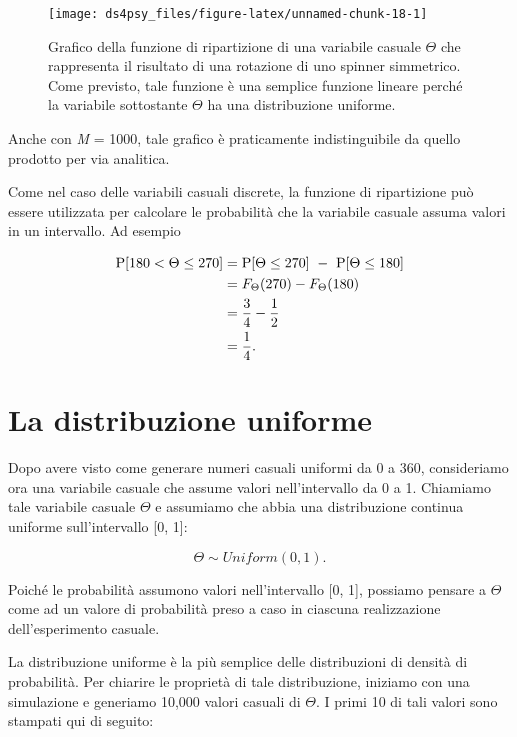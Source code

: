 \documentclass[
  11pt,
]{krantz}
\theoremstyle{definition}
\theoremstyle{definition}
\theoremstyle{definition}
\theoremstyle{definition}
\theoremstyle{remark}
\begin{document}
\begin{figure}[h]

{\centering \texttt{[image: ds4psy\_files/figure-latex/unnamed-chunk-18-1]} 

}

\caption{Grafico della funzione di ripartizione di una variabile casuale $\Theta$ che rappresenta il risultato di una rotazione di uno spinner simmetrico. Come previsto, tale funzione è una semplice funzione lineare perché la variabile sottostante $\Theta$ ha una distribuzione uniforme.}\label{fig:unnamed-chunk-18}
\end{figure}

Anche con \emph{M} = 1000, tale grafico è praticamente indistinguibile da quello prodotto per via analitica.

Come nel caso delle variabili casuali discrete, la funzione di ripartizione può essere utilizzata per calcolare le probabilità che la variabile casuale assuma valori in un intervallo. Ad esempio

\begin{align}
\mbox{P}[180 < \Theta \leq 270] &= \mbox{P}[\Theta \leq 270] \ - \ \mbox{P}[\Theta \leq 180] \notag\\
&= F_{\Theta}(270) - F_{\Theta}(180)\notag\\
&= \frac{3}{4} - \frac{1}{2} \notag\\
&= \frac{1}{4}.\noindent
\end{align}

\hypertarget{la-distribuzione-uniforme}{%
\section{La distribuzione uniforme}\label{la-distribuzione-uniforme}}

Dopo avere visto come generare numeri casuali uniformi da 0 a 360, consideriamo ora una variabile casuale che assume valori nell'intervallo da 0 a 1. Chiamiamo tale variabile casuale \(\Theta\) e assumiamo che abbia una distribuzione continua uniforme sull'intervallo {[}0, 1{]}:

\[
\Theta \sim Uniform(0, 1).
\]

Poiché le probabilità assumono valori nell'intervallo {[}0, 1{]}, possiamo pensare a \(\Theta\) come ad un valore di probabilità preso a caso in ciascuna realizzazione dell'esperimento casuale.

La distribuzione uniforme è la più semplice delle distribuzioni di densità di probabilità. Per chiarire le proprietà di tale distribuzione, iniziamo con una simulazione e generiamo 10,000 valori casuali di \(\Theta\). I primi 10 di tali valori sono stampati qui di seguito:
\end{document}
